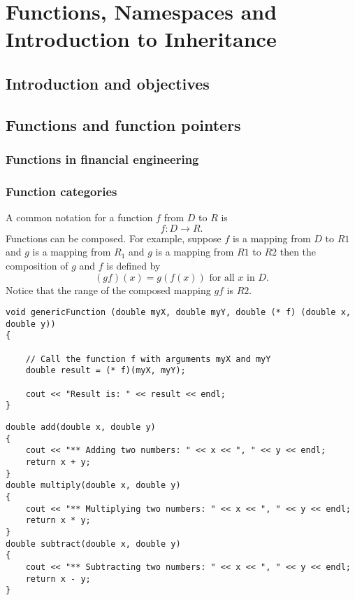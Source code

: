 \chapter{Functions, Namespaces and Introduction to Inheritance}

\section{Introduction and objectives}

\section{Functions and function pointers}

\subsection{Functions in financial engineering}

\subsection{Function categories}

A common notation for a function $f$ from $D$ to $R$ is \[ f\colon D\rightarrow R. \] Functions can be composed. For example, suppose $f$ is a mapping from $D$ to $R1$ and $g$ is a mapping from $R_{1}$ and $g$ is a mapping from $R1$ to $R2$ then the composition of $g$ and $f$ is defined by \[ \left(gf\right)\left(x\right)=g\left(f\left(x\right)\right)\text{ for all }x\text{ in }D. \] Notice that the range of the composed mapping $gf$ is $R2$.

\begin{lstlisting}
void genericFunction (double myX, double myY, double (* f) (double x, double y))
{

	// Call the function f with arguments myX and myY
	double result = (* f)(myX, myY);

	cout << "Result is: " << result << endl;
}
\end{lstlisting}

\begin{lstlisting}
double add(double x, double y)
{
	cout << "** Adding two numbers: " << x << ", " << y << endl;
	return x + y;
}
double multiply(double x, double y)
{
	cout << "** Multiplying two numbers: " << x << ", " << y << endl;
	return x * y;
}
double subtract(double x, double y)
{
	cout << "** Subtracting two numbers: " << x << ", " << y << endl;
	return x - y;
}
\end{lstlisting}

